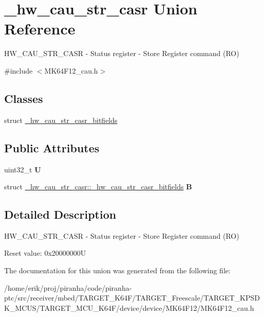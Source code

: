 \hypertarget{union__hw__cau__str__casr}{}\section{\+\_\+hw\+\_\+cau\+\_\+str\+\_\+casr Union Reference}
\label{union__hw__cau__str__casr}


H\+W\+\_\+\+C\+A\+U\+\_\+\+S\+T\+R\+\_\+\+C\+A\+SR -\/ Status register -\/ Store Register command (RO)  




{\ttfamily \#include $<$M\+K64\+F12\+\_\+cau.\+h$>$}

\subsection*{Classes}
\begin{DoxyCompactItemize}
\item 
struct \hyperlink{struct__hw__cau__str__casr_1_1__hw__cau__str__casr__bitfields}{\+\_\+hw\+\_\+cau\+\_\+str\+\_\+casr\+\_\+bitfields}
\end{DoxyCompactItemize}
\subsection*{Public Attributes}
\begin{DoxyCompactItemize}
\item 
uint32\+\_\+t {\bfseries U}\hypertarget{union__hw__cau__str__casr_a641ad738c41ab79f58f5b0bfa00b40ca}{}\label{union__hw__cau__str__casr_a641ad738c41ab79f58f5b0bfa00b40ca}

\item 
struct \hyperlink{struct__hw__cau__str__casr_1_1__hw__cau__str__casr__bitfields}{\+\_\+hw\+\_\+cau\+\_\+str\+\_\+casr\+::\+\_\+hw\+\_\+cau\+\_\+str\+\_\+casr\+\_\+bitfields} {\bfseries B}\hypertarget{union__hw__cau__str__casr_aee722a4dc4b0a6447f14c44ecb205fe4}{}\label{union__hw__cau__str__casr_aee722a4dc4b0a6447f14c44ecb205fe4}

\end{DoxyCompactItemize}


\subsection{Detailed Description}
H\+W\+\_\+\+C\+A\+U\+\_\+\+S\+T\+R\+\_\+\+C\+A\+SR -\/ Status register -\/ Store Register command (RO) 

Reset value\+: 0x20000000U 

The documentation for this union was generated from the following file\+:\begin{DoxyCompactItemize}
\item 
/home/erik/proj/piranha/code/piranha-\/ptc/src/receiver/mbed/\+T\+A\+R\+G\+E\+T\+\_\+\+K64\+F/\+T\+A\+R\+G\+E\+T\+\_\+\+Freescale/\+T\+A\+R\+G\+E\+T\+\_\+\+K\+P\+S\+D\+K\+\_\+\+M\+C\+U\+S/\+T\+A\+R\+G\+E\+T\+\_\+\+M\+C\+U\+\_\+\+K64\+F/device/device/\+M\+K64\+F12/M\+K64\+F12\+\_\+cau.\+h\end{DoxyCompactItemize}
